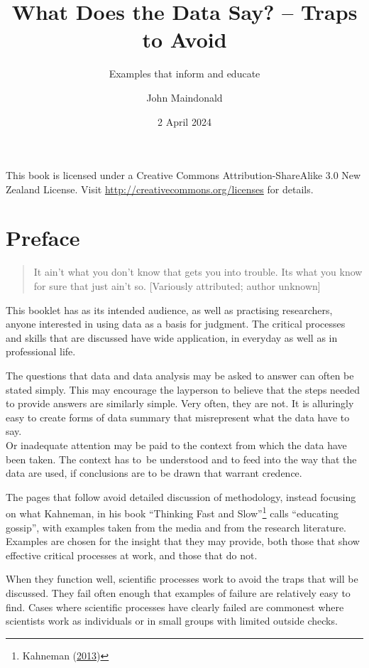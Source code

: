 \documentclass[
  10pt,
  b5paper]{book}
\title{What Does the Data Say? -- Traps to Avoid}
\subtitle{Examples that inform and educate}
\author{John Maindonald}
\date{2 April 2024}
\begin{document}
\maketitle

\newpage
This book is licensed under a Creative
Commons Attribution-ShareAlike 3.0 New Zealand License.
Visit \url{http://creativecommons.org/licenses} for details.


{
\hypersetup{linkcolor=}
\setcounter{tocdepth}{1}
\tableofcontents
}
\renewcommand{\bibname}{References}

\hypertarget{preface}{%
\chapter*{Preface}\label{preface}}

\begin{quote}
It ain't what you don't know that gets you into trouble.
Its what you know for sure that just ain't so.
{[}Variously attributed; author unknown{]}
\end{quote}

This booklet has as its intended audience, as well as practising
researchers, anyone interested in using data as a basis for
judgment. The critical processes and skills that are discussed
have wide application, in everyday as well as in professional life.

The questions that data and data analysis may be asked to answer can
often be stated simply. This may encourage the layperson to believe
that the steps needed to provide answers are similarly simple.
Very often, they are not. It is alluringly easy to create forms of
data summary that misrepresent what the data have to say.\\
Or inadequate attention may be paid to the context from which the
data have been taken. The context has to~be understood and to feed
into the way that the data are used, if conclusions are to be drawn
that warrant credence.

The pages that follow avoid detailed discussion of methodology,
instead focusing on what Kahneman, in his book
``Thinking Fast and Slow''\footnote{Kahneman (\protect\hyperlink{ref-kahneman_2013}{2013})} calls ``educating gossip'',
with examples taken from the media and from the research literature.
Examples are chosen for the insight that they may provide, both
those that show effective critical processes at work, and those
that do not.

When they function well, scientific processes work to avoid the
traps that will be discussed. They fail often enough that examples
of failure are relatively easy to find. Cases where scientific
processes have clearly failed are commonest where scientists work
as individuals or in small groups with limited outside checks.
\end{document}
